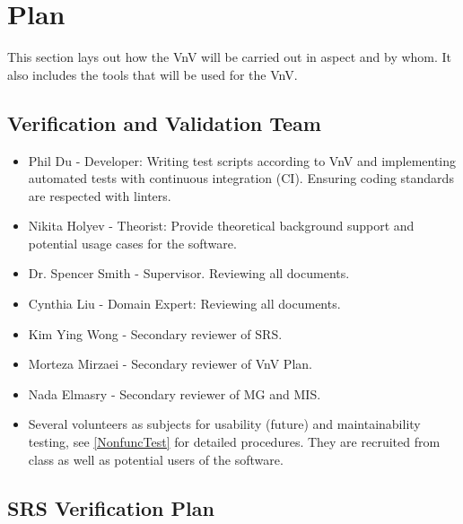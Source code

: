 \documentclass[12pt, titlepage]{article}
\begin{document}

\section{Plan}

This section lays out how the VnV will be carried out in aspect and by whom. It also includes the tools that will be used for the VnV.


\subsection{Verification and Validation Team}

\begin{itemize}
  \item Phil Du - Developer: Writing test scripts according to VnV and implementing automated tests with continuous integration (CI). Ensuring coding standards are respected with linters.
  \item Nikita Holyev - Theorist: Provide theoretical background support and potential usage cases for the software.
  \item Dr. Spencer Smith - Supervisor. Reviewing all documents.
  \item Cynthia Liu - Domain Expert: Reviewing all documents.
  \item Kim Ying Wong - Secondary reviewer of SRS.
  \item Morteza Mirzaei - Secondary reviewer of VnV Plan.
  \item Nada Elmasry - Secondary reviewer of MG and MIS.
  \item Several volunteers as subjects for usability (future) and maintainability testing, see \ref{NonfuncTest} for detailed procedures. They are recruited from class as well as potential users of the software.
\end{itemize}


\subsection{SRS Verification Plan}
\end{document}

